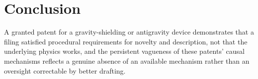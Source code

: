 \documentclass[11pt]{article}
\begin{document}
\section{Conclusion}

A granted patent for a gravity-shielding or antigravity device demonstrates that a filing satisfied procedural requirements for novelty and description, not that the underlying physics works, and the persistent vagueness of these patents' causal mechanisms reflects a genuine absence of an available mechanism rather than an oversight correctable by better drafting.
\end{document}
